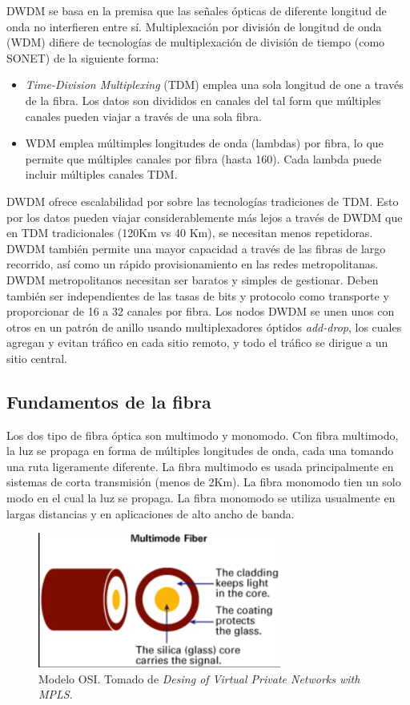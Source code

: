 \documentclass[10pt,journal,compsoc]{IEEEtran}
\begin{document}
DWDM se basa en la premisa que las señales ópticas de diferente longitud de onda no interfieren entre sí. Multiplexación por división de longitud de onda (WDM) difiere de tecnologías de multiplexación de división de tiempo (como SONET) de la siguiente forma:
\begin{itemize}
    \item \emph{Time-Division Multiplexing} (TDM) emplea una sola longitud de one a través de la fibra. Los datos son divididos en canales del tal form que múltiples canales pueden viajar a través de una sola fibra.
    \item WDM emplea múltimples longitudes de onda (lambdas) por fibra, lo que permite que múltiples canales por fibra (hasta 160). Cada lambda puede incluir múltiples canales TDM.
\end{itemize}

DWDM ofrece escalabilidad por sobre las tecnologías tradiciones de TDM. Esto por los datos pueden viajar considerablemente más lejos a través de DWDM que en TDM tradicionales (120Km vs 40 Km), se necesitan menos repetidoras. DWDM también permite una mayor capacidad a través de las fibras de largo recorrido, así como un rápido provisionamiento en las redes metropolitanas. DWDM metropolitanos necesitan ser baratos y simples de gestionar. Deben también ser independientes de las tasas de bits y protocolo como transporte y proporcionar de 16 a 32 canales por fibra. Los nodos DWDM se unen unos con otros en un patrón de anillo usando multiplexadores óptidos \emph{add-drop}, los cuales agregan y evitan tráfico en cada sitio remoto, y todo el tráfico se dirigue a un sitio central.

\subsection{Fundamentos de la fibra}
Los dos tipo de fibra óptica son multimodo y monomodo. Con fibra multimodo, la luz se propaga en forma de múltiples longitudes de onda, cada una tomando una ruta ligeramente diferente. La fibra multimodo es usada principalmente en sistemas de corta transmisión (menos de 2Km). La fibra monomodo tien un solo modo en el cual la luz se propaga. La fibra monomodo se utiliza usualmente en largas distancias y en aplicaciones de alto ancho de banda.


\begin{figure}[h]
    \center
    \includegraphics[width=8cm]{fibra-multimodo}
    \caption{Modelo OSI. Tomado de  \emph{Desing of Virtual Private Networks with MPLS}\cite{rexford}.}
    \label{fig:fibra-multimodo}
\end{figure}
\end{document}
